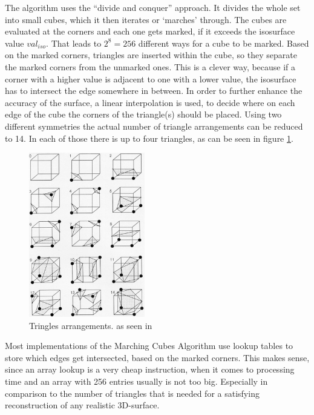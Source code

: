 The algorithm uses the ``divide and conquer'' approach. It divides the whole set into small cubes, which it then iterates or `marches' through. The cubes are evaluated at the corners and each one gets marked, if it exceeds the isosurface value $val_{iso}$. That leads to $2^8=256$ different ways for a cube to be marked. Based on the marked corners, triangles are inserted within the cube, so they separate the marked corners from the unmarked ones. This is a clever way, because if a corner with a higher value is adjacent to one with a lower value, the isosurface has to intersect the edge somewhere in between. In order to further enhance the accuracy of the surface, a linear interpolation is used, to decide where on each edge of the cube the corners of the triangle(s) should be placed. Using two different symmetries the actual number of triangle arrangements can be reduced to 14. In each of those there is up to four triangles, as can be seen in figure \ref{fig:cubes-arr}.
\begin{figure}\begin{center}
  \includegraphics[width=0.45\textwidth]{pictures/cubes_arrangements}
  \caption[Tringles arrangements]{Tringles arrangements. as seen in \cite{MarchCubes}}\label{fig:cubes-arr}
\end{center}\end{figure}

Most implementations of the Marching Cubes Algorithm use lookup tables to store which edges get intersected, based on the marked corners. This makes sense, since an array lookup is a very cheap instruction, when it comes to processing time and an array with 256 entries usually is not too big. Especially in comparison to the number of triangles that is needed for a satisfying reconstruction of any realistic 3D-surface.


